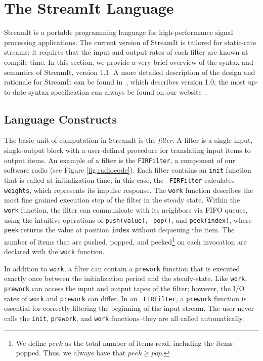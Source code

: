 \section{The StreamIt Language}
\label{sec:streamit}

StreamIt is a portable programming language for high-performance
signal processing applications.  The current version of StreamIt is
tailored for static-rate streams: it requires that the input and
output rates of each filter are known at compile time.  In this
section, we provide a very brief overview of the syntax and semantics
of StreamIt, version 1.1.  A more detailed description of the design
and rationale for StreamIt can be found in~\cite{streamitcc}, which
describes version 1.0; the most up-to-date syntax specification can
always be found on our website~\cite{streamitweb}.

\subsection{Language Constructs}

The basic unit of computation in StreamIt is the {\it filter}.  A
filter is a single-input, single-output block with a user-defined
procedure for translating input items to output items.  An example of
a filter is the {\tt FIRFilter}, a component of our software radio
(see Figure \ref{fig:radiocode}).  Each filter contains an {\tt init}
function that is called at initialization time; in this case, the {\tt
FIRFilter} calculates {\tt weights}, which represents its impulse
response.  The {\tt work} function describes the most fine grained
execution step of the filter in the steady state.  Within the {\tt
work} function, the filter can communicate with its neighbors via FIFO
queues, using the intuitive operations of {\tt push(value)}, {\tt
pop()}, and {\tt peek(index)}, where {\tt peek} returns the value at
position {\tt index} without dequeuing the item.  The number of items
that are pushed, popped, and peeked\footnote{We define $peek$ as the
total number of items read, including the items popped.  Thus, we
always have that $peek \ge pop$.} on each invocation are declared with
the {\tt work} function.

In addition to {\tt work}, a filter can contain a {\tt prework}
function that is executed exactly once between the initialization
period and the steady-state.  Like {\tt work}, {\tt prework} can
access the input and output tapes of the filter; however, the I/O
rates of {\tt work} and {\tt prework} can differ.  In an {\tt
FIRFilter}, a {\tt prework} function is essential for correctly
filtering the beginning of the input stream.  The user never calls the
{\tt init}, {\tt prework}, and {\tt work} functions--they are all
called automatically.

